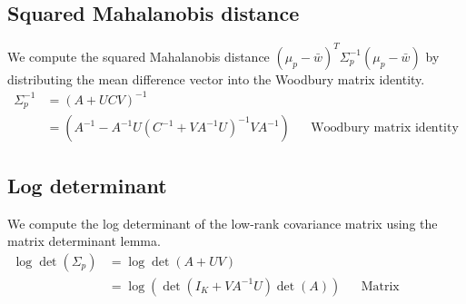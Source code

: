 \subsection{Squared Mahalanobis distance}
We compute the squared Mahalanobis distance $(\mu_p-\bar{w})^T\Sigma_p^{-1}(\mu_p-\bar{w})$ by distributing the mean difference vector into the Woodbury matrix identity.
\begin{align*}
\Sigma_p^{-1} &= (A + UCV )^{-1} \\
&= (A^{-1} - A^{-1}U(C^{-1} + VA^{-1}U)^{-1}VA^{-1}) && \text{Woodbury matrix identity}
\end{align*}

\subsection{Log determinant}
We compute the log determinant of the low-rank covariance matrix using the matrix determinant lemma.
\begin{align*}
\log \det(\Sigma_p) &= \log \det(A + UV) \\
&= \log (\det(I_K + VA^{-1}U) \det(A))  && \text{Matrix determinant lemma}
\end{align*}
